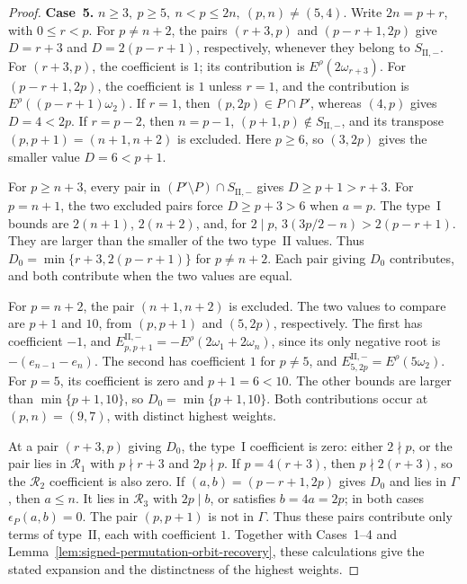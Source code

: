 \documentclass[11pt,a4paper]{amsart}
\theoremstyle{plain}
\numberwithin{equation}{section}
\newenvironment{pf}{\begin{proof}}{\end{proof}}
\begin{document}
\begin{pf}
	\smallskip
	
	\noindent\textbf{Case~5.} \(n\ge3,\ p\ge5,\ n<p\le2n,\ (p,n)\ne(5,4)\).
	Write \(2n=p+r\), with \(0\le r<p\).
	For \(p\ne n+2\), the pairs \((r+3,p)\) and \((p-r+1,2p)\)
	give \(D=r+3\) and \(D=2(p-r+1)\), respectively, whenever
	they belong to \(S_{\mathrm{II},-}\).
	For \((r+3,p)\), the coefficient is \(1\); its contribution is
	\(E^\rho(2\omega_{r+3})\).
	For \((p-r+1,2p)\), the coefficient is \(1\) unless \(r=1\),
	and the contribution is \(E^\rho((p-r+1)\omega_2)\).
	If \(r=1\), then \((p,2p)\in P\cap P'\), whereas \((4,p)\)
	gives \(D=4<2p\). If \(r=p-2\), then \(n=p-1\),
	\((p+1,p)\notin S_{\mathrm{II},-}\), and its transpose
	\((p,p+1)=(n+1,n+2)\) is excluded. Here \(p\ge6\), so
	\((3,2p)\) gives the smaller value \(D=6<p+1\).
	
	For \(p\ge n+3\), every pair in
	\((P'\setminus P)\cap S_{\mathrm{II},-}\) gives
	\(D\ge p+1>r+3\). For \(p=n+1\), the two excluded pairs
	force \(D\ge p+3>6\) when \(a=p\).
	The type~\(\mathrm I\) bounds are \(2(n+1)\), \(2(n+2)\),
	and, for \(2\mid p\), \(3(3p/2-n)>2(p-r+1)\).
	They are larger than the smaller of the two type~\(\mathrm{II}\)
	values. Thus \(D_0=\min\{r+3,2(p-r+1)\}\) for \(p\ne n+2\).
	Each pair giving \(D_0\) contributes, and both contribute when
	the two values are equal.
	
	For \(p=n+2\), the pair \((n+1,n+2)\) is excluded.
	The two values to compare are \(p+1\) and \(10\), from
	\((p,p+1)\) and \((5,2p)\), respectively. The first has coefficient \(-1\),
	and
	\(E_{p,p+1}^{\mathrm{II},-}=-E^\rho(2\omega_1+2\omega_n)\),
	since its only negative root is \(-(e_{n-1}-e_n)\).
	The second has coefficient \(1\) for \(p\ne5\), and
	\(E_{5,2p}^{\mathrm{II},-}=E^\rho(5\omega_2)\).
	For \(p=5\), its coefficient is zero and \(p+1=6<10\).
	The other bounds are larger than \(\min\{p+1,10\}\), so
	\(D_0=\min\{p+1,10\}\). Both contributions occur at \((p,n)=(9,7)\),
	with distinct highest weights.
	
	At a pair \((r+3,p)\) giving \(D_0\), the type~\(\mathrm I\)
	coefficient is zero: either \(2\nmid p\), or the pair lies in
	\(\mathcal R_1\) with \(p\nmid r+3\) and \(2p\nmid p\).
	If \(p=4(r+3)\), then \(p\nmid2(r+3)\), so the
	\(\mathcal R_2\) coefficient is also zero.
	If \((a,b)=(p-r+1,2p)\) gives \(D_0\) and lies in \(\Gamma\),
	then \(a\le n\). It lies in \(\mathcal R_3\) with \(2p\mid b\),
	or satisfies \(b=4a=2p\); in both cases \(\epsilon_P(a,b)=0\).
	The pair \((p,p+1)\) is not in \(\Gamma\).
	Thus these pairs contribute only terms of type~\(\mathrm{II}\),
	each with coefficient \(1\).
	Together with Cases~1--4 and
	Lemma~\ref{lem:signed-permutation-orbit-recovery}, these calculations
	give the stated expansion and the distinctness of the highest weights.
\end{pf}
\end{document}
